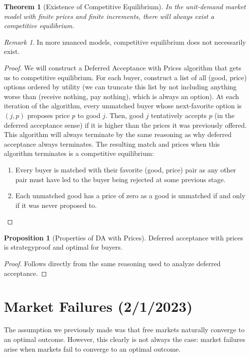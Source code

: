 \documentclass[dvipsnames]{article}
\newtheorem{theorem}{Theorem}[section]
\theoremstyle{definition}
\newtheorem{proposition}[definition]{Proposition}
\theoremstyle{remark}
\newtheorem*{remark}{Remark}
\begin{document}
\begin{theorem}[Existence of Competitive Equilibrium]
	In the unit-demand market model with finite prices and finite increments, there will always exist a competitive equilibrium.
\end{theorem}

\begin{remark}
	In more nuanced models, competitive equilibrium does not necessarily exist. 
\end{remark}

\begin{proof}
	We will construct a Deferred Acceptance with Prices algorithm that gets us to competitive equilibrium. For each buyer, construct a list of all (good, price) options ordered by utility (we can truncate this list by not including anything worse than (receive nothing, pay nothing), which is always an option). At each iteration of the algorithm, every unmatched buyer whose next-favorite option is $(j,p)$ proposes price $p$ to good $j$. Then, good $j$ tentatively accepts $p$ (in the deferred acceptance sense) if it is higher than the prices it was previously offered. This algorithm will always terminate by the same reasoning as why deferred acceptance always terminates. The resulting match and prices when this algorithm terminates is a competitive equilibrium:
	
	\begin{enumerate}
		\item Every buyer is matched with their favorite (good, price) pair as any other pair must have led to the buyer being rejected at some previous stage.
		\item Each unmatched good has a price of zero as a good is unmatched if and only if it was never proposed to.
	\end{enumerate}
\end{proof}

\begin{proposition}[Properties of DA with Prices]
	Deferred acceptance with prices is strategyproof and optimal for buyers.
\end{proposition}

\begin{proof}
	Follows directly from the same reasoning used to analyze deferred acceptance. 
\end{proof}

\newpage

\section{Market Failures (2/1/2023)}
The assumption we previously made was that free markets naturally converge to an optimal outcome. However, this clearly is not always the case: market failures arise when markets fail to converge to an optimal outcome. 
\end{document}
